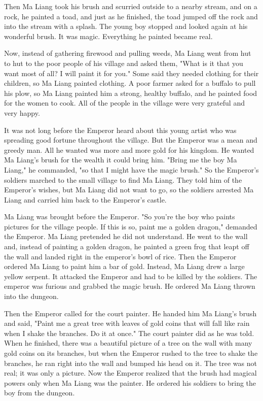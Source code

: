 Then Ma Liang took his brush and scurried outside to a nearby stream, and on a rock, he painted a toad, and just as he finished, the toad jumped off the rock and into the stream with a splash. The young boy stopped and looked again at his wonderful brush. It was magic. Everything he painted became real.

Now, instead of gathering firewood and pulling weeds, Ma Liang went from hut to hut to the poor people of his village and asked them, "What is it that you want most of all? I will paint it for you." Some said they needed clothing for their children, so Ma Liang painted clothing. A poor farmer asked for a buffalo to pull his plow, so Ma Liang painted him a strong, healthy buffalo, and he painted food for the women to cook. All of the people in the village were very grateful and very happy.

It was not long before the Emperor heard about this young artist who was spreading good fortune throughout the village. But the Emperor was a mean and greedy man. All he wanted was more and more gold for his kingdom. He wanted Ma Liang's brush for the wealth it could bring him. "Bring me the boy Ma Liang," he commanded, "so that I might have the magic brush." So the Emperor's soldiers marched to the small village to find Ma Liang. They told him of the Emperor's wishes, but Ma Liang did not want to go, so the soldiers arrested Ma Liang and carried him back to the Emperor's castle.

Ma Liang was brought before the Emperor. "So you're the boy who paints pictures for the village people. If this is so, paint me a golden dragon," demanded the Emperor. Ma Liang pretended he did not understand. He went to the wall and, instead of painting a golden dragon, he painted a green frog that leapt off the wall and landed right in the emperor's bowl of rice. Then the Emperor ordered Ma Liang to paint him a bar of gold. Instead, Ma Liang drew a large yellow serpent. It attacked the Emperor and had to be killed by the soldiers. The emperor was furious and grabbed the magic brush. He ordered Ma Liang thrown into the dungeon.

Then the Emperor called for the court painter. He handed him Ma Liang's brush and said, "Paint me a great tree with leaves of gold coins that will fall like rain when I shake the branches. Do it at once." The court painter did as he was told. When he finished, there was a beautiful picture of a tree on the wall with many gold coins on its branches, but when the Emperor rushed to the tree to shake the branches, he ran right into the wall and bumped his head on it. The tree was not real; it was only a picture. Now the Emperor realized that the brush had magical powers only when Ma Liang was the painter. He ordered his soldiers to bring the boy from the dungeon.

